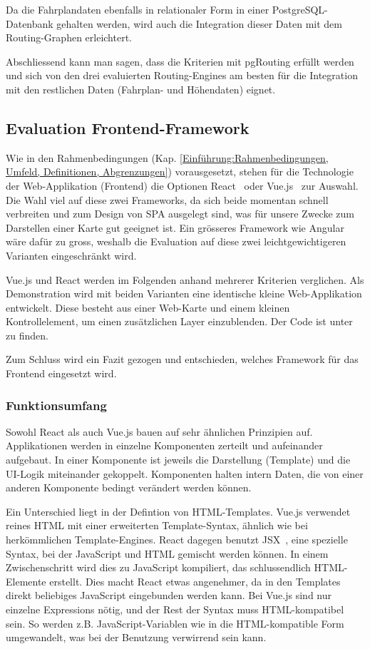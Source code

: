 Da die Fahrplandaten ebenfalls in relationaler Form in einer PostgreSQL-Datenbank gehalten werden, wird auch die Integration dieser Daten mit dem Routing-Graphen erleichtert.

Abschliessend kann man sagen, dass die Kriterien mit pgRouting erfüllt werden und sich von den drei evaluierten Routing-Engines am besten für die Integration mit den restlichen Daten (Fahrplan- und Höhendaten) eignet.

\subsection{Evaluation Frontend-Framework}
\label{Analyse:Evaluation Frontend-Framework}

Wie in den Rahmenbedingungen (Kap. \ref{Einführung:Rahmenbedingungen, Umfeld, Definitionen, Abgrenzungen}) vorausgesetzt, stehen für die Technologie der Web-Applikation (Frontend) die Optionen React~\cite{react} oder Vue.js~\cite{vuejs} zur Auswahl.
Die Wahl viel auf diese zwei Frameworks, da sich beide momentan schnell verbreiten und zum Design von \ac{SPA} ausgelegt sind, was für unsere Zwecke zum Darstellen einer Karte gut geeignet ist.
Ein grösseres Framework wie Angular wäre dafür zu gross, weshalb die Evaluation auf diese zwei leichtgewichtigeren Varianten eingeschränkt wird.

Vue.js und React werden im Folgenden anhand mehrerer Kriterien verglichen.
Als Demonstration wird mit beiden Varianten eine identische kleine Web-Applikation entwickelt.
Diese besteht aus einer Web-Karte und einem kleinen Kontrollelement, um einen zusätzlichen Layer einzublenden.
Der Code ist unter~\cite{github:playground} zu finden.

Zum Schluss wird ein Fazit gezogen und entschieden, welches Framework für das Frontend eingesetzt wird.

\subsubsection{Funktionsumfang}
\label{Analyse Framework:Funktionsumfang}

Sowohl React als auch Vue.js bauen auf sehr ähnlichen Prinzipien auf.
Applikationen werden in einzelne Komponenten zerteilt und aufeinander aufgebaut.
In einer Komponente ist jeweils die Darstellung (Template) und die UI-Logik miteinander gekoppelt.
Komponenten halten intern Daten, die von einer anderen Komponente bedingt verändert werden können.

Ein Unterschied liegt in der Defintion von HTML-Templates.
Vue.js verwendet reines HTML mit einer erweiterten Template-Syntax, ähnlich wie bei herkömmlichen Template-Engines.
React dagegen benutzt JSX~\cite{jsx}, eine spezielle Syntax, bei der JavaScript und HTML gemischt werden können.
In einem Zwischenschritt wird dies zu JavaScript kompiliert, das schlussendlich HTML-Elemente erstellt.
Dies macht React etwas angenehmer, da in den Templates direkt beliebiges JavaScript eingebunden werden kann.
Bei Vue.js sind nur einzelne Expressions nötig, und der Rest der Syntax muss HTML-kompatibel sein.
So werden z.B. JavaScript-Variablen wie  in die HTML-kompatible Form  umgewandelt, was bei der Benutzung verwirrend sein kann.


